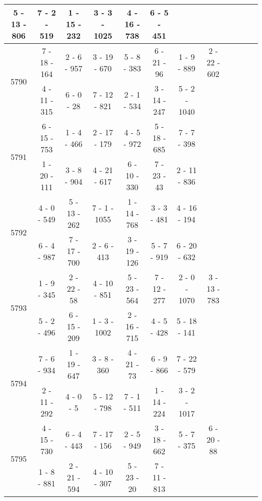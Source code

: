 \begin{longtable}{c | c | c | c | c | c | c | c | c | c | c | c}
5 - 13 - 806
&
7 - 2 - 519
&
1 - 15 - 232
&
3 - 3 - 1025
&
4 - 16 - 738
&
6 - 5 - 451
&\space\\\hline
\multirow{2}{*}{5790}
& 7 - 18 - 164
&
2 - 6 - 957
&
3 - 19 - 670
&
5 - 8 - 383
&
6 - 21 - 96
&
1 - 9 - 889
&
2 - 22 - 602
\\* \space
&
4 - 11 - 315
&
6 - 0 - 28
&
7 - 12 - 821
&
2 - 1 - 534
&
3 - 14 - 247
&
5 - 2 - 1040
&\space\\\hline
\multirow{2}{*}{5791}
& 6 - 15 - 753
&
1 - 4 - 466
&
2 - 17 - 179
&
4 - 5 - 972
&
5 - 18 - 685
&
7 - 7 - 398
&\space\\* \space
&
1 - 20 - 111
&
3 - 8 - 904
&
4 - 21 - 617
&
6 - 10 - 330
&
7 - 23 - 43
&
2 - 11 - 836
&\space\\\hline
\multirow{2}{*}{5792}
& 4 - 0 - 549
&
5 - 13 - 262
&
7 - 1 - 1055
&
1 - 14 - 768
&
3 - 3 - 481
&
4 - 16 - 194
&\space\\* \space
&
6 - 4 - 987
&
7 - 17 - 700
&
2 - 6 - 413
&
3 - 19 - 126
&
5 - 7 - 919
&
6 - 20 - 632
&\space\\\hline
\multirow{2}{*}{5793}
& 1 - 9 - 345
&
2 - 22 - 58
&
4 - 10 - 851
&
5 - 23 - 564
&
7 - 12 - 277
&
2 - 0 - 1070
&
3 - 13 - 783
\\* \space
&
5 - 2 - 496
&
6 - 15 - 209
&
1 - 3 - 1002
&
2 - 16 - 715
&
4 - 5 - 428
&
5 - 18 - 141
&\space\\\hline
\multirow{2}{*}{5794}
& 7 - 6 - 934
&
1 - 19 - 647
&
3 - 8 - 360
&
4 - 21 - 73
&
6 - 9 - 866
&
7 - 22 - 579
&\space\\* \space
&
2 - 11 - 292
&
4 - 0 - 5
&
5 - 12 - 798
&
7 - 1 - 511
&
1 - 14 - 224
&
3 - 2 - 1017
&\space\\\hline
\multirow{2}{*}{5795}
& 4 - 15 - 730
&
6 - 4 - 443
&
7 - 17 - 156
&
2 - 5 - 949
&
3 - 18 - 662
&
5 - 7 - 375
&
6 - 20 - 88
\\* \space
&
1 - 8 - 881
&
2 - 21 - 594
&
4 - 10 - 307
&
5 - 23 - 20
&
7 - 11 - 813
&

\end{longtable}
